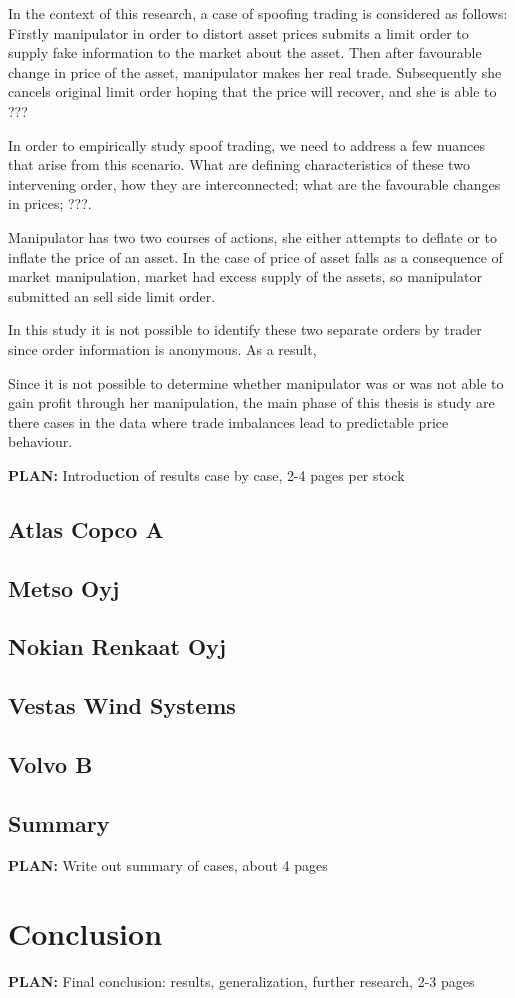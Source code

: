\documentclass{tut-thesis}
\begin{document}
In the context of this research, a case of spoofing trading is considered as follows: Firstly manipulator in order to distort asset prices submits a limit order to supply fake information to the market about the asset. Then after favourable change in price of the asset, manipulator makes her real trade. Subsequently she cancels original limit order hoping that the price will recover, and she is able to ???

In order to empirically study spoof trading, we need to address a few nuances that arise from this scenario. What are defining characteristics of these two intervening order, how they are interconnected; what are the favourable changes in prices; ???. 

Manipulator has two two courses of actions, she either attempts to deflate or to inflate the price of an asset. In the case of price of asset falls as a consequence of market manipulation, market had excess supply of the assets, so manipulator submitted an sell side limit order. 

In this study it is not possible to identify these two separate orders by trader since order information is anonymous. As a result, 

Since it is not possible to determine whether manipulator was or was not able to gain profit through her manipulation, the main phase of this thesis is study are there cases in the data where trade imbalances lead to predictable price behaviour.

\textbf{PLAN:} Introduction of results case by case, 2-4 pages per stock
\section{Atlas Copco A}
\section{Metso Oyj}
\section{Nokian Renkaat Oyj}
\section{Vestas Wind Systems}
\section{Volvo B}

\section{Summary}
\textbf{PLAN:} Write out summary of cases, about 4 pages

\chapter{Conclusion}
\textbf{PLAN:} Final conclusion: results, generalization, further research, 2-3 pages

\begingroup
\let\itshape\upshape
\printbibliography{}
\endgroup
\end{document}
